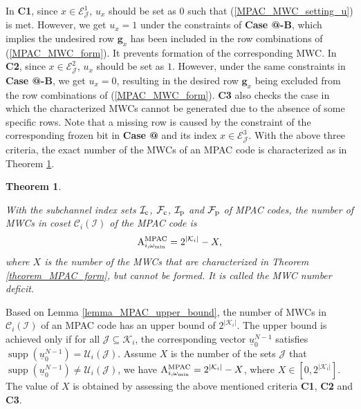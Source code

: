 \documentclass[12pt, draftclsnofoot, peerreview, onecolumn]{IEEEtran}
\makeatletter
\theoremstyle{noparent}
\newtheorem{theorem}{\textbf{Theorem}}
\newcommand{\Rmnum}[1]{\expandafter\@slowromancap\romannumeral #1@}
\renewenvironment{proof}[1][\proofname]{\par
  \pushQED{\qed}
  \normalfont \topsep6\p@\@plus6\p@\relax
  \trivlist
  \item[\hskip\labelsep
        \itshape
    #1\@addpunct{:}]\ignorespaces
}{
  \popQED\endtrivlist\@endpefalse
}
\DeclareMathOperator\supp{supp}
\makeatother
\begin{document}
In \textbf{C1}, since $x\in \mathcal{E}_{\mathcal{J}}^{1}$, $u_x$ should be set 
as $0$ such that (\ref{MPAC_MWC_setting_u}) is met. 
However, we get $u_x=1$ under the constraints of 
\textbf{Case \Rmnum{1}-B}, 
which implies the undesired row $\mathbf{g}_x$ has been included in the 
row combinations of (\ref{MPAC_MWC_form}).
It prevents formation of the corresponding MWC.
In \textbf{C2}, since $x\in \mathcal{E}_{\mathcal{J}}^{2}$, $u_x$ should be set as $1$.
However, under the same constraints in \textbf{Case \Rmnum{1}-B}, 
we get $u_x=0$, resulting in 
the desired row $\mathbf{g}_x$ being excluded from the row combinations of (\ref{MPAC_MWC_form}).
\textbf{C3} also checks the case in which the characterized MWCs
cannot be generated due to the absence of some specific rows.
Note that a missing row is caused by the constraint
of the corresponding frozen bit in \textbf{Case \Rmnum{3}}
and its index $x\in \mathcal{E}_{\mathcal{J}}^{3}$.
With the above three criteria, 
the exact number of the MWCs of an MPAC code is characterized as in 
Theorem \ref{theorem_MPAC_number}.


\begin{theorem}
    \label{theorem_MPAC_number}
    
    With the subchannel index sets $\mathcal{I}_{\rm c}$, $\mathcal{F}_{\rm c}$,
    $\mathcal{I}_{\rm p}$ and $\mathcal{F}_{\rm p}$ of MPAC codes,
    the number of MWCs in coset $\mathcal{C}_i(\mathcal{I})$ of the MPAC code is
    \begin{align}
        {\rm A}_{i,\omega_{\min}}^{\rm MPAC} = 2^{|\mathcal{K}_i|} - X,
    \end{align}
    where $X$ is the number of the MWCs that are characterized in Theorem \ref{theorem_MPAC_form},
    but cannot be formed. It is called the MWC number deficit.
\end{theorem}
\begin{proof}[\hspace{1.5em}Proof]
    Based on Lemma \ref{lemma_MPAC_upper_bound},
    the number of MWCs in $\mathcal{C}_i(\mathcal{I})$ of an MPAC code 
    has an upper bound of $2^{|\mathcal{K}_i|}$.
    The upper bound is achieved only if for all $\mathcal{J}\subseteq\mathcal{K}_i$,
    the corresponding vector ${\underline{u}_0^{N-1}}$ satisfies $\supp({\underline{u}_0^{N-1}})=\mathcal{U}_i(\mathcal{J})$.
    Assume $X$ is the number of the sets $\mathcal{J}$ that 
    $\supp({\underline{u}_0^{N-1}})\neq \mathcal{U}_i(\mathcal{J})$, 
    we have ${\rm A}_{i,\omega_{\min}}^{\rm MPAC} = 2^{|\mathcal{K}_i|} - X$,
    where $X\in[0,2^{|\mathcal{K}_i|}]$.
    The value of $X$ is obtained by assessing the above mentioned 
    criteria \textbf{C1}, \textbf{C2} and \textbf{C3}.
\end{proof}
\end{document}

